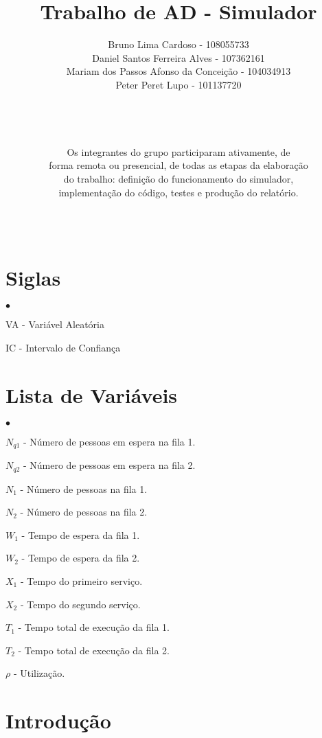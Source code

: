 \documentclass[a4paper,12pt]{report}
\title{Trabalho de AD - Simulador}
\author{Bruno Lima Cardoso - 108055733 \\
  Daniel Santos Ferreira Alves - 107362161 \\
  Mariam dos Passos Afonso da Conceição - 104034913 \\
  Peter Peret Lupo - 101137720 \\
\\
\\
\\
\\
Os integrantes do grupo participaram ativamente, de \\
forma remota ou presencial, de todas as etapas da elaboração \\
do trabalho: definição do funcionamento do simulador, \\
implementação do código, testes e produção do relatório.
\\
\\
\\
}
\begin{document}

\maketitle

\begin{abstract}
\end{abstract}

\chapter*{Siglas}
\begin{list}{$\bullet$}{}
  \item[VA] - Variável Aleatória
  \item[IC] - Intervalo de Confiança
\end{list}

\chapter*{Lista de Variáveis}
\begin{list}{$\bullet$}{}
  \item[$N_{q1}$] - Número de pessoas em espera na fila 1.
  \item[$N_{q2}$] - Número de pessoas em espera na fila 2.
  \item[$N_1$] - Número de pessoas na fila 1.
  \item[$N_2$] - Número de pessoas na fila 2.
  \item[$W_1$] - Tempo de espera da fila 1.
  \item[$W_2$] - Tempo de espera da fila 2.
  \item[$X_1$] - Tempo do primeiro serviço.
  \item[$X_2$] - Tempo do segundo serviço.
  \item[$T_1$] - Tempo total de execução da fila 1.
  \item[$T_2$] - Tempo total de execução da fila 2.
  \item[$\rho$] - Utilização.
\end{list}

\tableofcontents

\listoffigures

\listoftables

\chapter{Introdução}
\end{document}
